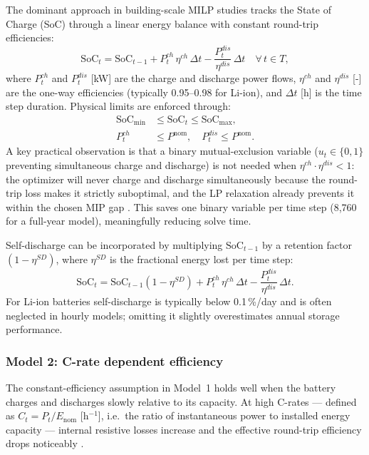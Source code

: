 \documentclass[11pt,a4paper]{report}
\begin{document}
The dominant approach in building-scale MILP studies \cite{Gabrielli2018Electrochemical, cardoso2014milp} tracks the State of Charge (SoC) through a linear energy balance with constant round-trip efficiencies:
\begin{equation}
    \text{SoC}_t = \text{SoC}_{t-1} + P^{ch}_t\,\eta^{ch}\,\Delta t - \frac{P^{dis}_t}{\eta^{dis}}\,\Delta t \quad \forall\, t \in T,
    \label{eq:bess_linear}
\end{equation}
where $P^{ch}_t$ and $P^{dis}_t$ [kW] are the charge and discharge power flows, $\eta^{ch}$ and $\eta^{dis}$ [-] are the one-way efficiencies (typically 0.95--0.98 for Li-ion), and $\Delta t$ [h] is the time step duration.
Physical limits are enforced through:
\begin{align}
    \text{SoC}_{\min} &\leq \text{SoC}_t \leq \text{SoC}_{\max}, \label{eq:bess_soc_lim}\\
    P^{ch}_t         &\leq P^{\text{nom}},\quad P^{dis}_t \leq P^{\text{nom}}. \label{eq:bess_pow_lim}
\end{align}
A key practical observation is that a binary mutual-exclusion variable ($u_t \in \{0,1\}$ preventing simultaneous charge and discharge) is not needed when $\eta^{ch}\cdot\eta^{dis} < 1$: the optimizer will never charge and discharge simultaneously because the round-trip loss makes it strictly suboptimal, and the LP relaxation already prevents it within the chosen MIP gap \cite{Gabrielli2018Electrochemical}.
This saves one binary variable per time step (8,760 for a full-year model), meaningfully reducing solve time.

Self-discharge can be incorporated by multiplying $\text{SoC}_{t-1}$ by a retention factor $(1-\eta^{SD})$, where $\eta^{SD}$ is the fractional energy lost per time step:
\begin{equation}
    \text{SoC}_t = \text{SoC}_{t-1}(1-\eta^{SD}) + P^{ch}_t\,\eta^{ch}\,\Delta t - \frac{P^{dis}_t}{\eta^{dis}}\,\Delta t.
    \label{eq:bess_selfdischarge}
\end{equation}
For Li-ion batteries self-discharge is typically below 0.1\,\%/day and is often neglected in hourly models; omitting it slightly overestimates annual storage performance.

\subsubsection{Model 2: C-rate dependent efficiency}
\label{subsub:bess_crate}

The constant-efficiency assumption in Model~1 holds well when the battery charges and discharges slowly relative to its capacity.
At high C-rates --- defined as $C_t = P_t / E_{\text{nom}}$ [h$^{-1}$], i.e.\ the ratio of instantaneous power to installed energy capacity --- internal resistive losses increase and the effective round-trip efficiency drops noticeably \cite{Bobanac2021}.
\end{document}
